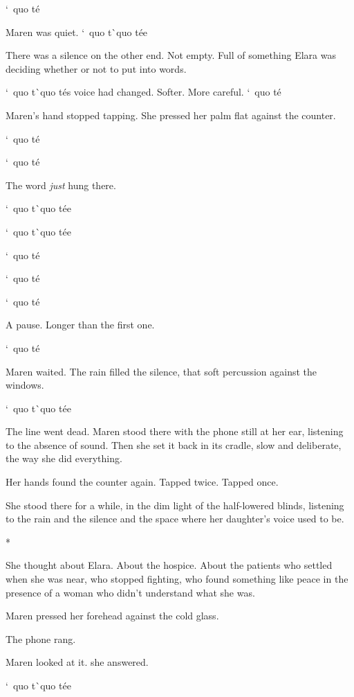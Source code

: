 \documentclass[12pt,letterpaper,openany]{book}
\begin{document}
\par
`\ quo t\'e{}
\par
Maren was quiet.  `\ quo t\`\ quo t\'e{}e{}
\par
There was a silence on the other end. Not empty. Full of something Elara was deciding whether or not to put into words.
\par
`\ quo t\`\ quo t\'e{}s voice had changed. Softer. More careful. `\ quo t\'e{}
\par
Maren's hand stopped tapping. She pressed her palm flat against the counter.
\par
`\ quo t\'e{}
\par
`\ quo t\'e{}
\par
The word \textit{just} hung there. 
\par
`\ quo t\`\ quo t\'e{}e{}
\par
`\ quo t\`\ quo t\'e{}e{}
\par
`\ quo t\'e{}
\par
`\ quo t\'e{}
\par
`\ quo t\'e{}
\par
A pause. Longer than the first one.
\par
`\ quo t\'e{}
\par
Maren waited. The rain filled the silence, that soft percussion against the windows.
\par
`\ quo t\`\ quo t\'e{}e{}
\par
The line went dead. Maren stood there with the phone still at her ear, listening to the absence of sound. Then she set it back in its cradle, slow and deliberate, the way she did everything.
\par
Her hands found the counter again. Tapped twice. Tapped once.
\par
She stood there for a while, in the dim light of the half-lowered blinds, listening to the rain and the silence and the space where her daughter's voice used to be.
\par
*
\par
She thought about Elara. About the hospice. About the patients who settled when she was near, who stopped fighting, who found something like peace in the presence of a woman who didn't understand what she was.
\par
Maren pressed her forehead against the cold glass. 
\par
The phone rang.
\par
Maren looked at it.  she answered.
\par
`\ quo t\`\ quo t\'e{}e{}
\par
\end{document}
